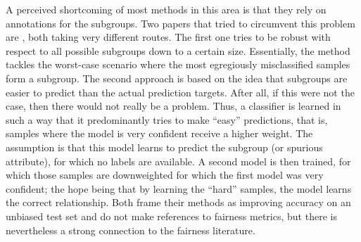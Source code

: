 A perceived shortcoming of most methods in this area is that they rely on annotations for the subgroups.
Two papers that tried to circumvent this problem are \citet{HasSriNamLia18,nam2020learning},
both taking very different routes.
The first one tries to be robust with respect to all possible subgroups down to a certain size.
Essentially, the method tackles the worst-case scenario where the most egregiously misclassified samples form a subgroup.
The second approach is based on the idea that subgroups are easier to predict than the actual prediction targets.
After all, if this were not the case, then there would not really be a problem.
Thus, a classifier is learned in such a way that it predominantly tries to make ``easy'' predictions,
that is, samples where the model is very confident receive a higher weight.
The assumption is that this model learns to predict the subgroup (or spurious attribute),
for which no labels are available.
A second model is then trained, for which those samples are downweighted for which the first model was very confident;
the hope being that by learning the ``hard'' samples, the model learns the correct relationship.
Both \citet{HasSriNamLia18,nam2020learning} frame their methods as improving accuracy on an unbiased test set
and do not make references to fairness metrics,
but there is nevertheless a strong connection to the fairness literature.




